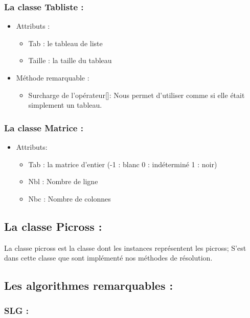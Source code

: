 \documentclass{article}
\begin{document}
\subsubsection{La classe Tabliste :}
\begin{itemize}
\item Attributs :
\begin{itemize}
\item Tab : le tableau de liste
\item Taille : la taille du tableau
\end{itemize}
\item Méthode remarquable :
\begin{itemize}
\item Surcharge de l'opérateur[]: Nous permet d'utiliser comme si elle était simplement un tableau.
\end{itemize}
\end{itemize}
\subsubsection{La classe Matrice :}
\begin{itemize}
\item Attributs:
\begin{itemize}
\item Tab : la matrice d'entier (-1 : blanc 0 : indéterminé 1 : noir)
\item Nbl : Nombre de ligne
\item Nbc : Nombre de colonnes
\end{itemize}
\end{itemize}
\subsection{ La classe Picross :}
La classe picross est la classe dont les instances représentent les picross; S'est dans cette classe que sont implémenté nos méthodes de résolution.
\subsection{Les algorithmes remarquables :}
\subsubsection{SLG :}
\end{document}
